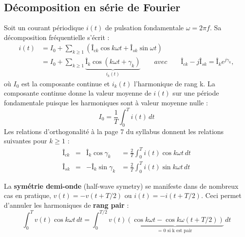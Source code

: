 	\subsection{Décomposition en série de Fourier}
	Soit un courant périodique $i(t)$ de pulsation fondamentale $\omega = 2\pi f$. Sa décomposition fréquentielle s'écrit : 
	\begin{equation}
	\begin{aligned}
		i(t) &= I_0 + \sum _{k\geq 1} \left(Î_{ck} \cos k\omega t + Î_{sk} \sin \omega t\right)\\
			&= I_0 + \sum _{k\geq 1} \underbrace{Î_k \cos (k\omega t +\gamma _k)}_{i_k(t)} \qquad avec \qquad Î_{ck} - jÎ_{sk} = Î_k e^{j\gamma _k},
	\end{aligned}
	\end{equation}
	où $I_0$ est la composante continue et $i_k(t)$ l'harmonique de rang k. La composante continue donne la valeur moyenne de $i(t)$ sur une période fondamentale puisque les harmoniques sont à valeur moyenne nulle : 
	\begin{equation}
		I_0 = \frac{1}{T}\int _0 ^T i(t)\, dt
	\end{equation}
	Les relations d'orthogonalité à la page 7 du syllabus donnent les relations suivantes pour $k\geq 1$ : 
	\begin{equation}
	\begin{aligned}
		Î_{ck} &= &Î_k \cos \gamma _k &= \frac{2}{T} \int _0 ^T i(t) \cos k\omega t\, dt\\
		Î_{sk} &= &-Î_k \sin \gamma _k &= \frac{2}{T} \int _0 ^T i(t) \sin k\omega t\, dt
	\end{aligned}
	\end{equation}
	
	La \textbf{symétrie demi-onde} (half-wave symetry) se manifeste dans de nombreux cas en pratique, $v(t) = -v(t+T/2)$ ou $i(t) = -i(t+T/2)$. Ceci permet d'annuler les harmoniques de \textbf{rang pair} : 
	\begin{equation}
		\int _0 ^T v(t)\cos k \omega t \, dt = \int _0 ^{T/2} v(t) \underbrace{\left(\cos k\omega t - \cos k\omega(t+T/2)\right)}_{\mbox{= 0 si k est pair}}\, dt
	\end{equation}
	

